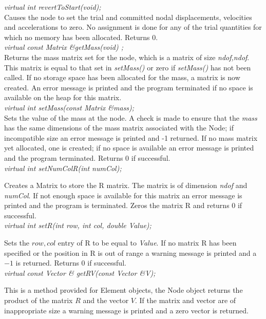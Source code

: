 {\em virtual int revertToStart(void);} \\
Causes the node to set the trial and committed nodal displacements,
velocities and accelerations to zero. No assignment is done for any of
the trial quantities for which no memory has been allocated. Returns $0$.\\


{\em virtual const Matrix \&getMass(void) ;}\\
Returns the mass matrix set for the node, which is a matrix of size
{\em ndof,ndof}. This matrix is equal to that set in {\em setMass()}
or zero if {\em setMass()} has not been called. If no storage space
has been allocated for the mass, a matrix is now created. An error
message is printed and the program terminated if no space is available
on the heap for this matrix.\\

{\em virtual int setMass(const Matrix \&mass);} \\
Sets the value of the mass at the node. A check is made to ensure that
the {\em mass} has the same dimensions of the mass matrix associated with the
Node; if incompatible size an error message is printed and -1 returned. If no
mass matrix yet allocated, one is created; if no space is available an
error message is printed and the program terminated. Returns 0 if successful. \\

{\em virtual int setNumColR(int numCol);} 

Creates a Matrix to store the R matrix. The matrix is of dimension
{\em ndof} and {\em numCol}. If not enough space is available for this
matrix an error message is printed and the program is terminated. Zeros the
matrix R and returns $0$ if successful. \\

{\em virtual int setR(int row, int col, double Value);} 

Sets the {\em \(row,col\)} entry of R to be equal to {\em Value}. If
no matrix R has been specified or the position in R is out of range a
warning message is printed and a $-1$ is returned. Returns $0$ if
successful. \\


{\em virtual const Vector \& getRV(const Vector \&V);} 

This is a method provided for Element objects, the Node object returns
the product of the matrix $R$ and the vector $V$. If the matrix 
and vector are of inappropriate size a warning message is printed and
a zero vector is returned. \\

